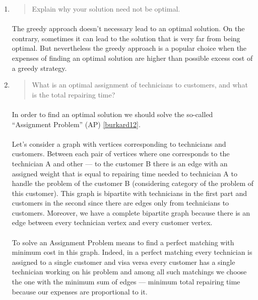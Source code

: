 \begin{enumerate}[(a)]
\begin{enumerate}[1.]
\item\begin{quote}Explain why your solution need not be optimal.\end{quote}

	\paragraph{}
	The greedy approach doesn't necessary lead to an optimal solution. On the contrary, sometimes it can lead to the solution that is very far from being optimal. But nevertheless the greedy approach is a popular choice when the expenses of finding an optimal solution are higher than possible excess cost of a greedy strategy.

\item\begin{quote}What is an optimal assignment of technicians to customers, and what is the
total repairing time?\end{quote}

	\paragraph{}
	In order to find an optimal solution we should solve the so-called ``Assignment Problem'' (AP) \ref{burkard12}.

	\paragraph{}
	Let's consider a graph with vertices corresponding to technicians and customers. Between each pair of vertices where one corresponds to the technician A and other --- to the customer B there is an edge with an assigned weight that is equal to repairing time needed to technician A to handle the problem of the customer B (considering category of the problem of this customer). This graph is bipartite with technicians in the first part and customers in the second since there are edges only from technicians to customers. Moreover, we have a complete bipartite graph because there is an edge between every technician vertex and every customer vertex.

	\paragraph{}
	To solve an Assignment Problem means to find a perfect matching with minimum cost in this graph. Indeed, in a perfect matching every technician is assigned to a single customer and visa versa every customer has a single technician working on his problem and among all such matchings we choose the one with the minimum sum of edges --- minimum total repairing time because our expenses are proportional to it.


\end{enumerate}
\end{enumerate}
